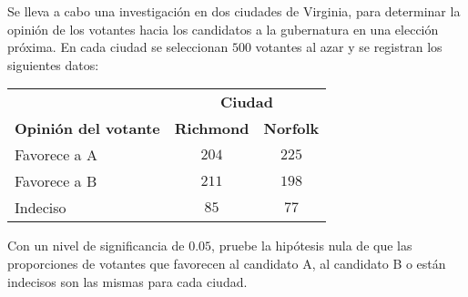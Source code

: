 \begin{enunciado}
 Se lleva a cabo una investigaci\'on en dos ciudades de Virginia,
 para determinar la opini\'on de los votantes hacia los candidatos
 a la gubernatura en una elecci\'on pr\'oxima.
 En cada ciudad se seleccionan $500$ votantes al azar y se registran
 los siguientes datos:
 \begin{center}
  \begin{tabular}{lcc}
   & \multicolumn{2}{c}{\textbf{Ciudad}} \\
   \cline{2-3}
   \textbf{Opini\'on del votante} & \textbf{Richmond} & \textbf{Norfolk} \\
   \hline
   Favorece a A & $204$ & $225$ \\
   Favorece a B & $211$ & $198$ \\
   Indeciso & $85$ & $77$
  \end{tabular}
 \end{center}
 Con un nivel de significancia de $0.05$, pruebe la hip\'otesis nula
 de que las proporciones de votantes que favorecen al candidato A,
 al candidato B o est\'an indecisos son las mismas para cada ciudad.
\end{enunciado}

